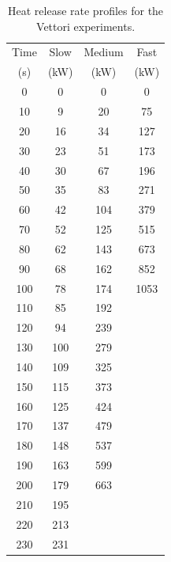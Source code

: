 \begin{table}[h!]
\centering
\caption[Heat release rate profiles for the Vettori experiments]{Heat release rate profiles for the Vettori experiments.}
\begin{tabular}{|c|c|c|c|}
\hline
Time    & Slow     & Medium     & Fast   \\
(s)     & (kW)     & (kW)       & (kW)   \\  \hline \hline
0       & 0        & 0          & 0      \\ \hline 10      & 9        &  20        &  75    \\ \hline
20      & 16       &  34        &  127   \\ \hline
30      &   23     &  51        &  173   \\ \hline
40      &   30     &  67        &  196   \\ \hline
50      &   35     &  83        &  271   \\ \hline
60      &   42     &  104       &  379   \\ \hline
70      &   52     &  125       &  515   \\ \hline
80      &   62     &  143       &  673   \\ \hline
90      &   68     &  162       &  852   \\ \hline
100      &  78      &  174       & 1053   \\ \hline
110      &  85      &  192       &        \\ \hline
120      &  94      &  239       &        \\ \hline
130      &  100     &  279       &        \\ \hline
140      &  109     &  325       &        \\ \hline
150      &  115     &  373       &        \\ \hline
160      &  125     &  424       &        \\ \hline
170      &  137     &  479       &        \\ \hline
180      &  148     &  537       &        \\ \hline
190      &  163     &  599       &        \\ \hline
200      &  179     &  663       &        \\ \hline
210      &  195     &            &        \\ \hline
220      &  213     &            &        \\ \hline
230      &  231     &            &        \\ \hline

\end{tabular}
\end{table}
